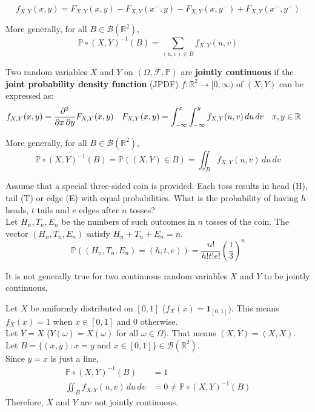 \documentclass{huhtakm-template-book}
\newcommand{\prob}{\mathbb{P}}
\begin{document}
\begin{rem}
	\begin{equation*}
		f_{X,Y}(x,y)=F_{X,Y}(x,y)-F_{X,Y}(x^{-},y)-F_{X,Y}(x,y^{-})+F_{X,Y}(x^{-},y^{-})
	\end{equation*}
\end{rem}
\begin{rem}
	More generally, for all $B\in\mathcal{B}(\mathbb{R}^{2})$,
	\begin{equation*}
		\prob\circ(X,Y)^{-1}(B)=\sum_{(u,v)\in B}f_{X,Y}(u,v)
	\end{equation*}
\end{rem}
\begin{defn}
	Two random variables $X$ and $Y$ on $(\Omega,\mathcal{F},\prob)$ are \textbf{jointly continuous} if the \textbf{joint probability density function} (JPDF) $f:\mathbb{R}^{2}\to [0,\infty)$ of $(X,Y)$ can be expressed as:
	\begin{align*}
		f_{X,Y}(x,y)&=\pdv*{F_{X,Y}(x,y)}{x,y} & F_{X,Y}(x,y)&=\int_{-\infty}^{x}\int_{-\infty}^{y}f_{X,Y}(u,v)\,du\,dv & x,y&\in\mathbb{R}
	\end{align*}
\end{defn}
\begin{rem}
	More generally, for all $B\in\mathcal{B}(\mathbb{R}^{2})$,
	\begin{equation*}
		\prob\circ(X,Y)^{-1}(B)=\prob((X,Y)\in B)=\iint_{B}f_{X,Y}(u,v)\,du\,dv
	\end{equation*}
\end{rem}
\begin{eg}
	Assume that a special three-sided coin is provided. Each toss results in head (H), tail (T) or edge (E) with equal probabilities. What is the probability of having $h$ heads, $t$ tails and $e$ edges after $n$ tosses?\\
	Let $H_{n},T_{n},E_{n}$ be the numbers of such outcomes in $n$ tosses of the coin. The vector $(H_{n},T_{n},E_{n})$ satisfy $H_{n}+T_{n}+E_{n}=n$.
	\begin{equation*}
		\prob((H_{n},T_{n},E_{n})=(h,t,e))=\frac{n!}{h!t!e!}\left(\frac{1}{3}\right)^{n}
	\end{equation*}
\end{eg}
\begin{rem}
	It is not generally true for two continuous random variables $X$ and $Y$ to be jointly continuous.
\end{rem}
\begin{eg}
	Let $X$ be uniformly distributed on $[0,1]$ ($f_{X}(x)=\mathbf{1}_{[0,1]}$). This means $f_{X}(x)=1$ when $x\in[0,1]$ and $0$ otherwise.\\
	Let $Y=X$ ($Y(\omega)=X(\omega)$ for all $\omega\in\Omega$). That means $(X,Y)=(X,X)$. Let $B=\{(x,y):x=y\text{ and }x\in[0,1]\}\in\mathcal{B}(\mathbb{R}^{2})$.\\
	Since $y=x$ is just a line,
	\begin{align*}
		\prob\circ(X,Y)^{-1}(B)&=1\\
		\iint_{B}f_{X,Y}(u,v)\,du\,dv&=0\neq\prob\circ(X,Y)^{-1}(B)
	\end{align*}
	Therefore, $X$ and $Y$ are not jointly continuous.
\end{eg}
\end{document}
